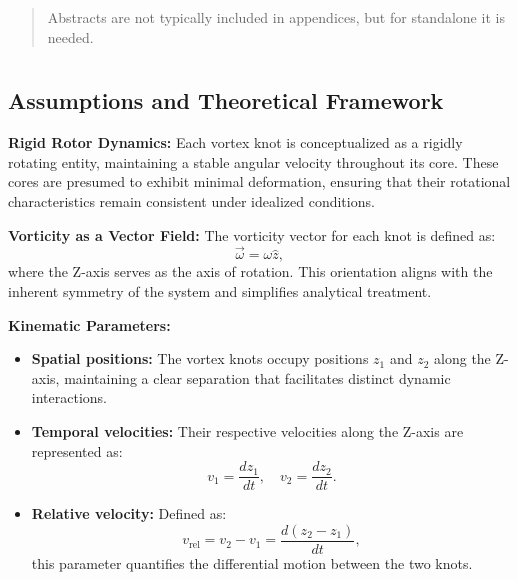 \documentclass[12pt]{article}
\begin{document}
    \titlepageOpen

    \begin{abstract}
        Abstracts are not typically included in appendices, but for standalone it is needed.
    \end{abstract}

    \titlepageClose
    \fi

    \section{\appendixtitle}


    \subsection*{Assumptions and Theoretical Framework}
    \textbf{Rigid Rotor Dynamics:} Each vortex knot is conceptualized as a rigidly rotating entity, maintaining a stable angular velocity throughout its core. These cores are presumed to exhibit minimal deformation, ensuring that their rotational characteristics remain consistent under idealized conditions.

    \textbf{Vorticity as a Vector Field:} The vorticity vector for each knot is defined as:
    \begin{equation*}
        \vec{\omega} = \omega \hat{z},
    \end{equation*}
    where the Z-axis serves as the axis of rotation. This orientation aligns with the inherent symmetry of the system and simplifies analytical treatment.

    \textbf{Kinematic Parameters:}
    \begin{itemize}
        \item \textbf{Spatial positions:} The vortex knots occupy positions $z_1$ and $z_2$ along the Z-axis, maintaining a clear separation that facilitates distinct dynamic interactions.
        \item \textbf{Temporal velocities:} Their respective velocities along the Z-axis are represented as:
        \begin{equation*}
            v_1 = \frac{dz_1}{dt}, \quad v_2 = \frac{dz_2}{dt}.
        \end{equation*}
        \item \textbf{Relative velocity:} Defined as:
        \begin{equation*}
            v_\text{rel} = v_2 - v_1 = \frac{d(z_2 - z_1)}{dt},
        \end{equation*}
        this parameter quantifies the differential motion between the two knots.
    \end{itemize}
\end{document}
